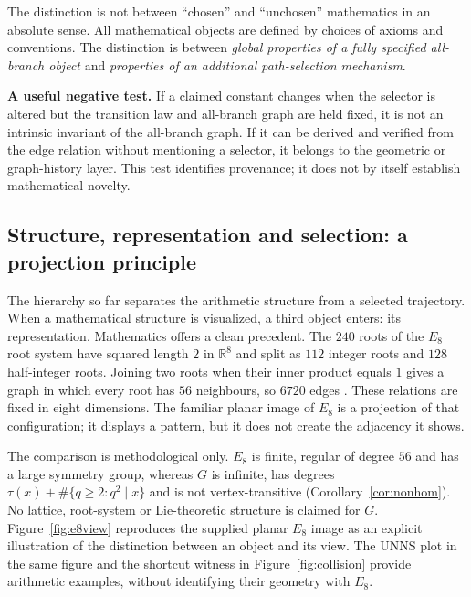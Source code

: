 \documentclass[11pt,a4paper]{article}
\theoremstyle{definition}\newtheorem{definition}[theorem]{Definition}
\begin{document}
The distinction is not between ``chosen'' and ``unchosen'' mathematics in an absolute sense. All mathematical objects are defined by choices of axioms and conventions. The distinction is between \emph{global properties of a fully specified all-branch object} and \emph{properties of an additional path-selection mechanism}.

\begin{scopebox}
\textbf{A useful negative test.} If a claimed constant changes when the selector is altered but the transition law and all-branch graph are held fixed, it is not an intrinsic invariant of the all-branch graph. If it can be derived and verified from the edge relation without mentioning a selector, it belongs to the geometric or graph-history layer. This test identifies provenance; it does not by itself establish mathematical novelty.
\end{scopebox}

\subsection{Structure, representation and selection: a projection principle}
\label{sec:projection}
The hierarchy so far separates the arithmetic structure from a selected trajectory. When a mathematical structure is visualized, a third object enters: its representation. Mathematics offers a clean precedent. The $240$ roots of the $E_8$ root system have squared length $2$ in $\mathbb R^8$ and split as $112$ integer roots and $128$ half-integer roots. Joining two roots when their inner product equals $1$ gives a graph in which every root has $56$ neighbours, so $6720$ edges \cite{conwaysloane,humphreys}. These relations are fixed in eight dimensions. The familiar planar image of $E_8$ is a projection of that configuration; it displays a pattern, but it does not create the adjacency it shows.

The comparison is methodological only. $E_8$ is finite, regular of degree $56$ and has a large symmetry group, whereas $G$ is infinite, has degrees $\tau(x)+\#\{q\ge2:q^2\mid x\}$ and is not vertex-transitive (Corollary~\ref{cor:nonhom}). No lattice, root-system or Lie-theoretic structure is claimed for $G$. Figure~\ref{fig:e8view} reproduces the supplied planar $E_8$ image as an explicit illustration of the distinction between an object and its view. The UNNS plot in the same figure and the shortcut witness in Figure~\ref{fig:collision} provide arithmetic examples, without identifying their geometry with $E_8$.
\end{document}
